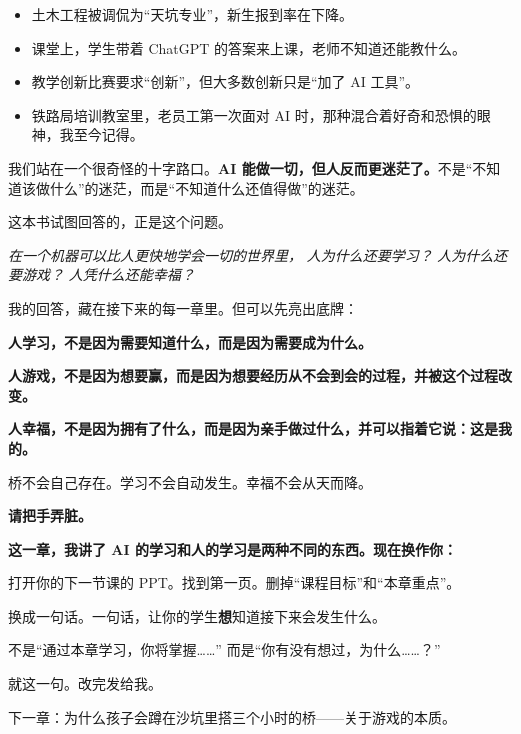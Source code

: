 \begin{itemize}
  \item 土木工程被调侃为“天坑专业”，新生报到率在下降。
  \item 课堂上，学生带着 ChatGPT 的答案来上课，老师不知道还能教什么。
  \item 教学创新比赛要求“创新”，但大多数创新只是“加了 AI 工具”。
  \item 铁路局培训教室里，老员工第一次面对 AI 时，那种混合着好奇和恐惧的眼神，我至今记得。
\end{itemize}

我们站在一个很奇怪的十字路口。\textbf{AI 能做一切，但人反而更迷茫了。}不是“不知道该做什么”的迷茫，而是“不知道什么还值得做”的迷茫。

这本书试图回答的，正是这个问题。

\vspace{0.5cm}

\begin{center}
{\large\itshape 在一个机器可以比人更快地学会一切的世界里，}
{\large\itshape 人为什么还要学习？}
{\large\itshape 人为什么还要游戏？}
{\large\itshape 人凭什么还能幸福？}
\end{center}

\vspace{0.5cm}

我的回答，藏在接下来的每一章里。但可以先亮出底牌：

\textbf{人学习，不是因为需要知道什么，而是因为需要成为什么。}

\textbf{人游戏，不是因为想要赢，而是因为想要经历从不会到会的过程，并被这个过程改变。}

\textbf{人幸福，不是因为拥有了什么，而是因为亲手做过什么，并可以指着它说：这是我的。}

桥不会自己存在。学习不会自动发生。幸福不会从天而降。

\textbf{请把手弄脏。}

\vspace{1cm}

\begin{decision-point}
\label{decision:chap1}

\noindent\textbf{这一章，我讲了 AI 的学习和人的学习是两种不同的东西。现在换作你：}

\vspace{0.3cm}

\noindent 打开你的下一节课的 PPT。找到第一页。删掉“课程目标”和“本章重点”。

\noindent 换成一句话。一句话，让你的学生\textbf{想}知道接下来会发生什么。

\noindent 不是“通过本章学习，你将掌握\ldots\ldots”
\noindent 而是“你有没有想过，为什么\ldots\ldots？”

\vspace{0.3cm}

\noindent 就这一句。改完发给我。
\end{decision-point}

\vspace{0.5cm}

\begin{flushright}
{\small\color{muted} 下一章：为什么孩子会蹲在沙坑里搭三个小时的桥——关于游戏的本质。}
\end{flushright}